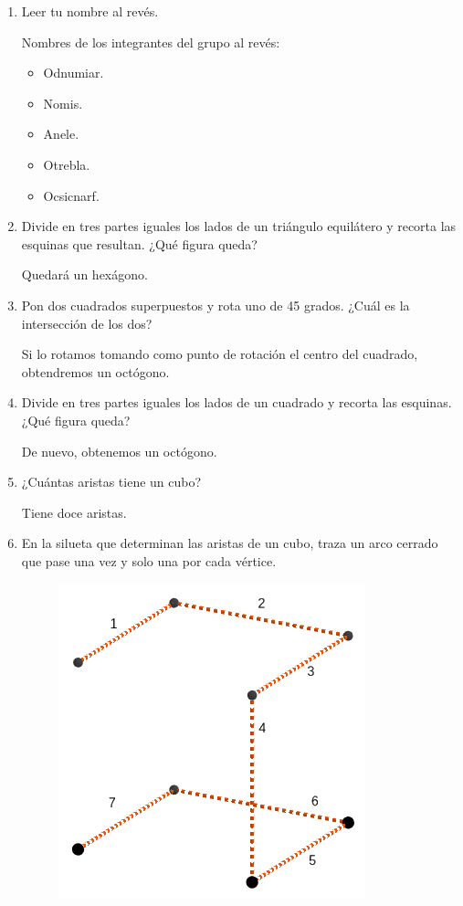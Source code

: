 \begin{enumerate}
	\item Leer tu nombre al revés.
	
	Nombres de los integrantes del grupo al revés:
	\begin{itemize}
		\item Odnumiar.
		\item Nomis.
		\item Anele.
		\item Otrebla.
		\item Ocsicnarf.
	\end{itemize}
	
	\item Divide en tres partes iguales los lados de un triángulo equilátero y recorta las esquinas que resultan. ¿Qué figura queda? 
	
	Quedará un hexágono.
	
	\item Pon dos cuadrados superpuestos y rota uno de 45 grados. ¿Cuál es la intersección de los dos?
	
	Si lo rotamos tomando como punto de rotación el centro del cuadrado, obtendremos un octógono.
	
	\item Divide en tres partes iguales los lados de un cuadrado y recorta las esquinas. ¿Qué figura queda?
	
	De nuevo, obtenemos un octógono.
	
	\item ¿Cuántas aristas tiene un cubo?
	
	Tiene doce aristas.
	
	\item En la silueta que determinan las aristas de un cubo, traza un arco cerrado que pase una vez y solo una por cada vértice.
	
	\begin{figure}[H]
		\centering
		\includegraphics[scale=0.5]{images/grafos_poligonos_poliedros/a2.png}
	\end{figure}
	

\end{enumerate}
